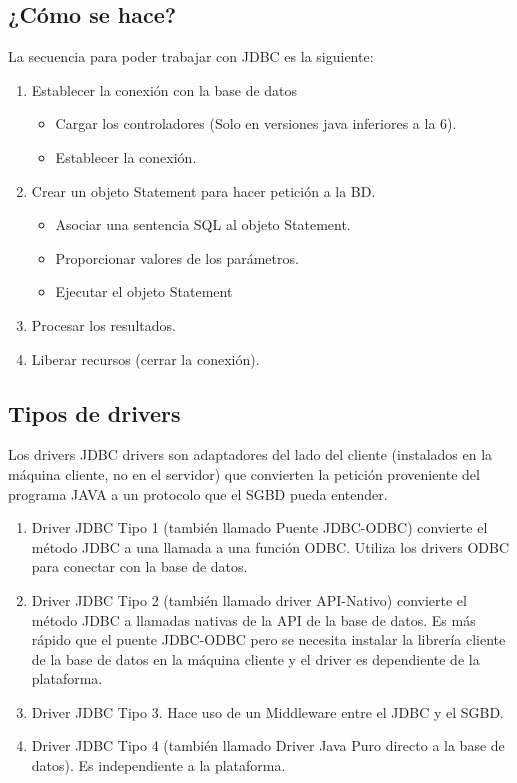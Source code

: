 \documentclass[a4paper,12pt]{article}
\begin{document}
\subsection{¿Cómo se hace?}
La secuencia para poder trabajar con JDBC es la siguiente:
\begin{enumerate}
 \item Establecer la conexión con la base de datos
 \begin{itemize}
  \item Cargar los controladores (Solo en versiones java inferiores a la 6).
  \item Establecer la conexión.
 \end{itemize}
 
 \item Crear un objeto Statement para hacer petición a la BD.
 \begin{itemize}
  \item Asociar una sentencia SQL al objeto Statement.
  \item Proporcionar valores de los parámetros.
  \item Ejecutar el objeto Statement
 \end{itemize}
 
 \item Procesar los resultados.
 \item Liberar recursos (cerrar la conexión).

\end{enumerate}

\subsection{Tipos de drivers}
Los drivers JDBC drivers son adaptadores del lado del cliente (instalados en la máquina cliente, no en el servidor) que convierten la petición proveniente del programa JAVA a un protocolo que el SGBD pueda entender.

\begin{enumerate}
 \item Driver JDBC Tipo 1 (también llamado Puente JDBC-ODBC) convierte el método JDBC a una llamada a una función ODBC. Utiliza los drivers ODBC para conectar con la base de datos.
 \item Driver JDBC Tipo 2 (también llamado driver API-Nativo) convierte el método JDBC a llamadas nativas de la API de la base de datos. Es más rápido que el puente JDBC-ODBC pero se necesita instalar la librería cliente de la base de datos en la máquina cliente y el driver es dependiente de la plataforma.
 \item  Driver JDBC Tipo 3. Hace uso de un Middleware entre el JDBC y el SGBD.
 \item Driver JDBC Tipo 4 (también llamado Driver Java Puro directo a la base de datos). Es independiente a la plataforma.
\end{enumerate}
\end{document}
